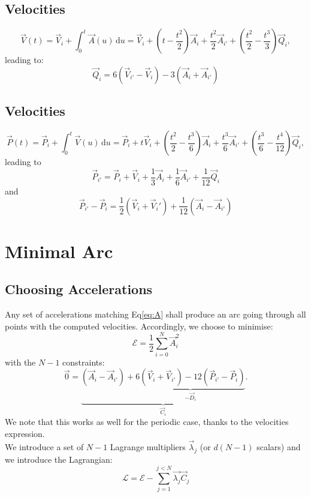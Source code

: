 \documentclass[aps,12pt]{revtex4}
\begin{document}
\subsection{Velocities}
\begin{equation}
	\vec{V}(t) = \vec{V}_i + \int_0^t \vec{A}(u)\,\mathrm{d}u =
	 \vec{V}_i 
	 + \left(t-\frac{t^2}{2}\right) \vec{A}_i 
	 + \frac{t^2}{2} \vec{A}_{i'}
	 + \left(\frac{t^2}{2}-\frac{t^3}{3}\right) \vec{Q}_i,
\end{equation}
leading to:
\begin{equation}
\boxed{
	\vec{Q}_i = 6 \left( \vec{V}_{i'} - \vec{V}_i \right) - 3 \left( \vec{A}_i + \vec{A}_{i'} \right)
}
\end{equation}

\subsection{Velocities}
\begin{equation}
	\vec{P}(t) = \vec{P}_i + \int_0^t \vec{V}(u) \, \mathrm{d}u = 
	\vec{P}_i 
	+ t \vec{V}_i
	+ \left( \frac{t^2}{2} - \frac{t^3}{6}\right) \vec{A}_i
	+ \frac{t^3}{6} \vec{A}_{i'}
	+ \left(\frac{t^3}{6} -\frac{t^4}{12} \right) \vec{Q}_i,
\end{equation}
leading to
\begin{equation}
	\vec{P}_{i'} =  \vec{P}_{i} + \vec{V}_i + \frac{1}{3} \vec{A}_i + \frac{1}{6} \vec{A}_{i'} + \frac{1}{12} \vec{Q}_i
\end{equation}
and
\begin{equation}
\label{eq:A}
\boxed{
	\vec{P}_{i'} - \vec{P}_i = \frac{1}{2}\left( \vec{V}_i + \vec{V}_i' \right) + \frac{1}{12} \left( \vec{A}_i - \vec{A}_{i'} \right)
	}
\end{equation}

\section{Minimal Arc}

\subsection{Choosing Accelerations}
Any set of accelerations matching Eq\eqref{eq:A} shall produce an arc going through all points with the computed velocities.
Accordingly, we choose to minimise:
\begin{equation}
	\mathcal{E} = \frac{1}{2} \sum_{i=0}^N \vec{A}_i^2
\end{equation}
with the $N-1$ constraints:
\begin{equation}
	\vec{0} = \underbrace{\left(\vec{A}_i  - \vec{A}_{i'} \right) + \underbrace{6 \left(\vec{V}_{i} + \vec{V}_{i'}\right) - 12 \left(\vec{P}_{i'} - \vec{P}_{i}\right)}_{-\vec{D}_i}}_{\vec{C}_i}.
\end{equation}
We note that this works as well for the periodic case, thanks to the velocities expression.\\
We introduce a set of $N-1$ Lagrange multipliers $\vec{\lambda}_j$ (or $d(N-1)$ scalars) and we introduce the Lagrangian:
\begin{equation}
	\mathcal{L} = \mathcal{E} - \sum_{j=1}^{j<N} \vec{\lambda_j} \vec{C}_j	
\end{equation}
\end{document}
